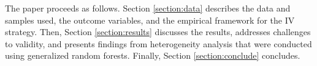 The paper proceeds as follows. Section \ref{section:data} describes the data and samples used, the outcome variables, and the empirical framework for the IV strategy. Then, Section \ref{section:results} discusses the results, addresses challenges to validity, and presents findings from heterogeneity analysis that were conducted using generalized random forests. Finally, Section \ref{section:conclude} concludes.
